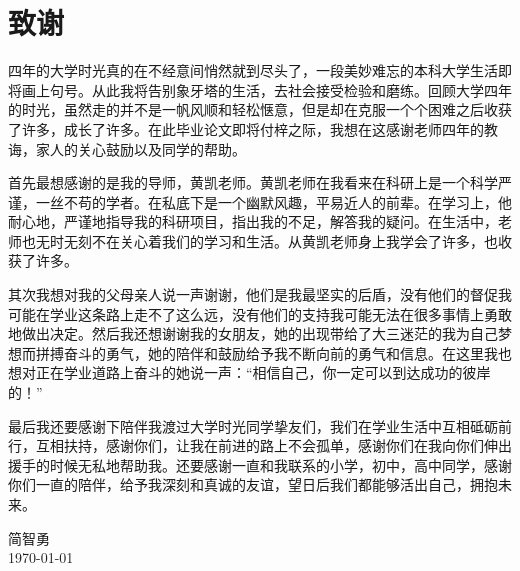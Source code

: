 
\chapter{致谢}

%
%

	四年的大学时光真的在不经意间悄然就到尽头了，一段美妙难忘的本科大学生活即将画上句号。从此我将告别象牙塔的生活，去社会接受检验和磨练。回顾大学四年的时光，虽然走的并不是一帆风顺和轻松惬意，但是却在克服一个个困难之后收获了许多，成长了许多。在此毕业论文即将付梓之际，我想在这感谢老师四年的教诲，家人的关心鼓励以及同学的帮助。
	
	首先最想感谢的是我的导师，黄凯老师。黄凯老师在我看来在科研上是一个科学严谨，一丝不苟的学者。在私底下是一个幽默风趣，平易近人的前辈。在学习上，他耐心地，严谨地指导我的科研项目，指出我的不足，解答我的疑问。在生活中，老师也无时无刻不在关心着我们的学习和生活。从黄凯老师身上我学会了许多，也收获了许多。
	
	其次我想对我的父母亲人说一声谢谢，他们是我最坚实的后盾，没有他们的督促我可能在学业这条路上走不了这么远，没有他们的支持我可能无法在很多事情上勇敢地做出决定。然后我还想谢谢我的女朋友，她的出现带给了大三迷茫的我为自己梦想而拼搏奋斗的勇气，她的陪伴和鼓励给予我不断向前的勇气和信息。在这里我也想对正在学业道路上奋斗的她说一声：“相信自己，你一定可以到达成功的彼岸的！”
	
	最后我还要感谢下陪伴我渡过大学时光同学挚友们，我们在学业生活中互相砥砺前行，互相扶持，感谢你们，让我在前进的路上不会孤单，感谢你们在我向你们伸出援手的时候无私地帮助我。还要感谢一直和我联系的小学，初中，高中同学，感谢你们一直的陪伴，给予我深刻和真诚的友谊，望日后我们都能够活出自己，拥抱未来。

\vskip 108pt
\begin{flushright}
	简智勇\makebox[1cm]{} \\
\today
\end{flushright}

